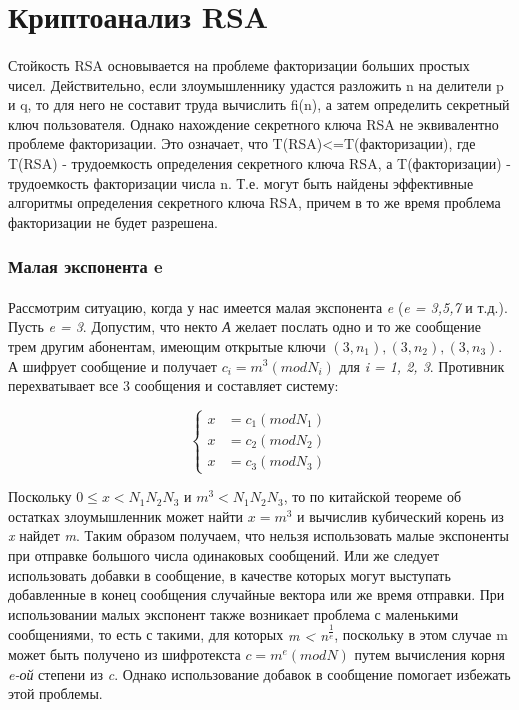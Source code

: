 \section{Криптоанализ RSA}

  \paragraph{} Стойкость RSA основывается на проблеме факторизации больших простых чисел. Действительно, если злоумышленнику удастся разложить
  n на делители p и q, то для него не составит труда вычислить fi(n), а затем определить секретный ключ пользователя. 
  Однако   нахождение секретного ключа RSA не эквивалентно проблеме факторизации. Это означает, что T(RSA)<=T(факторизации), 
  где T(RSA) - трудоемкость определения секретного ключа RSA, а T(факторизации) - трудоемкость факторизации числа n. Т.е. 
  могут быть найдены эффективные алгоритмы определения секретного ключа RSA, причем в то же время проблема факторизации не будет разрешена.

\subsubsection{Малая экспонента e}

  \paragraph{} Рассмотрим ситуацию, когда у нас имеется малая экспонента \textit{e} (\textit{e = 3,5,7} и т.д.). Пусть \textit{e = 3}. Допустим, что некто
  \textit{А} желает послать одно и то же сообщение трем другим абонентам, имеющим открытые ключи \textit{{$(3, n_1), (3, n_2), (3, n_3)$}}. А шифрует 
  сообщение и получает \textit{{$c_i = m^3(mod N_i)$}} для \textit{i = 1, 2, 3}. Противник перехватывает все 3 сообщения и составляет систему:
  
    \begin{equation}
	\begin{cases}
	   x &= c_1(mod N_1) \\
	   x &= c_2(mod N_2)\\
	   x &= c_3(mod N_3)
	\end{cases}    
    \end{equation}

  Поскольку \textit{{$0 \le x < N_1 N_2 N_3$}} и \textit{{$m^3 < N_1 N_2 N_3$}}, то по китайской теореме об остатках злоумышленник может найти 
  \textit{{$x = m^3$}} и вычислив кубический корень из \textit{x} найдет \textit{m}. Таким образом получаем, что нельзя использовать малые экспоненты 
  при отправке большого числа одинаковых сообщений. Или же следует использовать добавки в сообщение, в качестве которых могут выступать добавленные в 
  конец сообщения случайные вектора или же время отправки. При использовании малых экспонент также возникает проблема с маленькими сообщениями, то есть 
  с такими, для которых \textit{m < n\textsuperscript{{$\frac{1}{e}$}}}, поскольку в этом случае m может быть получено из шифротекста 
  \textit{{$c = m^e(mod N)$}} путем вычисления корня \textit{e-ой} степени из \textit{c}. Однако использование добавок в сообщение помогает избежать этой 
  проблемы.

